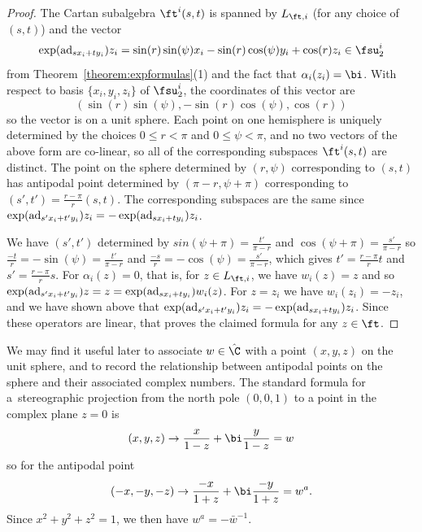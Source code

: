 \begin{proof}
The Cartan subalgebra $\ft^i(s,t)$ is spanned by $L_{\ft,i}$ (for any choice of $(s,t)$) and the vector
\[\exp( {\rm ad}_{sx_i+ty_i}) z_i= \sin(r)\sin(\psi)x_i - \sin(r) \cos(\psi) y_i + \cos(r) z_i \in \fsu_2^i\]
from Theorem~\ref{theorem:expformulas}(1) and the fact that $\alpha_i(z_i) = \bi$.
With respect to basis $\{x_i,y_i,z_i\}$ of $\fsu_2^i$, the coordinates of this vector are
\[(\sin(r)\sin(\psi), - \sin(r) \cos(\psi), \cos(r))\]
so the vector is on a unit sphere. Each point on one hemisphere is uniquely determined by the choices
$0\leq r < \pi$ and $0\leq\psi<\pi$, and no two vectors of the above form are co-linear, so all of the corresponding subspaces $\ft^i(s,t)$ are distinct. The point on the sphere determined by $(r,\psi)$ corresponding to $(s,t)$ has antipodal point determined by $(\pi-r,\psi+\pi)$ corresponding to $(s',t') = \frac{r-\pi}{r}(s,t)$. The corresponding subspaces are the same since
$\exp( {\rm ad}_{s'x_i+t'y_i}) z_i = - \exp( {\rm ad}_{sx_i+ty_i}) z_i$.

We have $(s',t')$ determined by $sin(\psi+\pi) = \frac{t'}{\pi-r}$ and $\cos(\psi+\pi) = \frac{s'}{\pi-r}$ so $\frac{-t}{r} = -\sin(\psi) = \frac{t'}{\pi-r}$ and $\frac{-s}{r} = -\cos(\psi) = \frac{s'}{\pi-r}$, which gives $t' = \frac{r-\pi}{r} t$ and $s' = \frac{r-\pi}{r} s$. For $\alpha_i(z) = 0$, that is, for $z\in L_{\ft,i}$, we have $w_i(z) = z$ and so $\exp( {\rm ad}_{s'x_i+t'y_i}) z = z = \exp( {\rm ad}_{sx_i+ty_i}) w_i(z)$. For $z = z_i$ we have $w_i(z_i) = -z_i$, and we have shown above that $\exp( {\rm ad}_{s'x_i+t'y_i}) z_i = - \exp( {\rm ad}_{sx_i+ty_i}) z_i$. Since these operators are linear, that proves the claimed formula for any $z\in\ft$.
\end{proof}

\begin{Remark}We may find it useful later to associate $w\in\hat\C$ with a point $(x,y,z)$ on the unit sphere, and to record the relationship between antipodal points on the sphere and their associated complex numbers. The standard formula for a~stereographic projection from the north pole $(0,0,1)$ to a point in the complex plane $z = 0$ is
\[(x,y,z) \to \frac{x}{1-z} + \bi \frac{y}{1-z} = w\]
so for the antipodal point
\[(-x,-y,-z) \to \frac{-x}{1+z} + \bi \frac{-y}{1+z} = w^a.\]
Since $x^2 + y^2 + z^2 = 1$, we then have $w^a = -{\bar w}^{-1}$.
\end{Remark}

